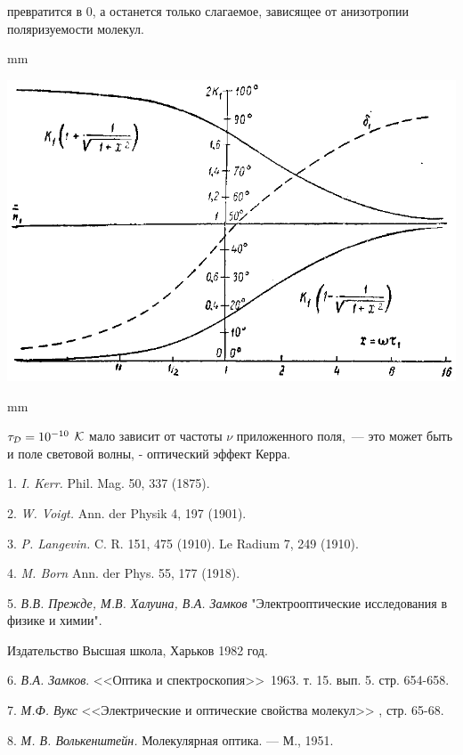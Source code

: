 превратится в $0$, а останется только слагаемое, зависящее от
анизотропии поляризуемости молекул.\par
{} mm
\centerline{\hbox{\includegraphics[scale=1]{Ris/ris_eps/eff_kerr/perem_pole.eps}}}

 mm
\par $\tau_{\cal D}=10^{-10}$ ${\cal K}$ мало зависит от частоты $\nu$
приложенного поля,~--- это может быть и поле световой волны, -
оптический эффект Керра.


1. {\it I. Kerr.} Phil. Mag. 50, 337 (1875).

2. {\it W. Voigt.} Ann. der Physik 4, 197 (1901).

3. {\it P. Langevin.} C. R. 151, 475 (1910). Le Radium 7, 249 (1910).

4. {\it M. Born} Ann. der Phys. 55, 177 (1918).

5. {\it В.В. Прежде, М.В.
Халуина, В.А. Замков} "Электрооптические исследования в физике и
химии".\par\noindent Издательство Высшая школа, Харьков 1982 год.

6. {\it В.А. Замков}. <<Оптика и
спектроскопия>>\ 1963. т. 15. вып. 5. стр. 654-658.

7. {\it М.Ф. Вукс} <<Электрические и
оптические свойства молекул>> , стр. 65-68.

8. {\it М. В. Волькенштейн.} Молекулярная оптика. --- М., 1951.
